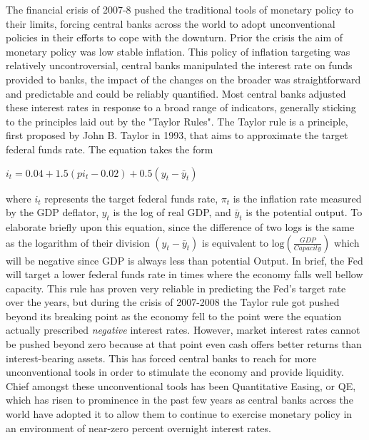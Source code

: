 \documentclass[12pt]{report}
\begin{document}
The financial crisis of 2007-8 pushed the traditional tools of monetary policy to their limits, forcing central banks across the world to adopt unconventional policies in their efforts to cope with the downturn.
Prior the crisis the aim of monetary policy was low stable inflation. This policy of inflation targeting was relatively uncontroversial, central banks manipulated the interest rate on funds provided to banks, the impact of the changes on the broader was straightforward and predictable and could be reliably quantified.\autocite[271]{joyce2012quantitative}
Most central banks adjusted these interest rates in response to a broad range of indicators, generally sticking to the principles laid out by the "Taylor Rules".\autocite[271]{joyce2012quantitative}
The Taylor rule is a principle, first proposed by John B. Taylor in 1993, that aims to approximate the target federal funds rate.\autocite[232]{woodford2001taylor}
The equation takes the form
\begin{center}
$i_t = 0.04 + 1.5(pi_t -0.02) + 0.5(y_t - \bar{y}_t)$
\end{center}
where $i_t$ represents the target federal funds rate, $\pi_t$ is the inflation rate measured by the GDP deflator, $y_t$ is the log of real GDP, and $\bar{y}_t$ is the potential output.\autocite[232]{woodford2001taylor}
To elaborate briefly upon this equation, since the difference of two logs is the same as the logarithm of their division $(y_t - \bar{y}_t)$ is equivalent to $\mbox{log}(\frac{GDP}{Capacity})$ which will be negative since GDP is always less than potential Output.
In brief, the Fed will target a lower federal funds rate in times where the economy falls well bellow capacity.
This rule has proven very reliable in predicting the Fed's target rate over the years,\autocite[232]{woodford2001taylor} but during the crisis of 2007-2008 the Taylor rule got pushed beyond its breaking point as the economy fell to the point were the equation actually prescribed \emph{negative} interest rates.
However, market interest rates cannot be pushed beyond zero because at that point even cash offers better returns than interest-bearing assets.\autocite[272]{joyce2012quantitative}
This has forced central banks to reach for more unconventional tools in order to stimulate the economy and provide liquidity.
Chief amongst these unconventional tools has been Quantitative Easing, or QE, which has risen to prominence in the past few years as central banks across the world have adopted it to allow them to continue to exercise monetary policy in an environment of near-zero percent overnight interest rates.
\end{document}
